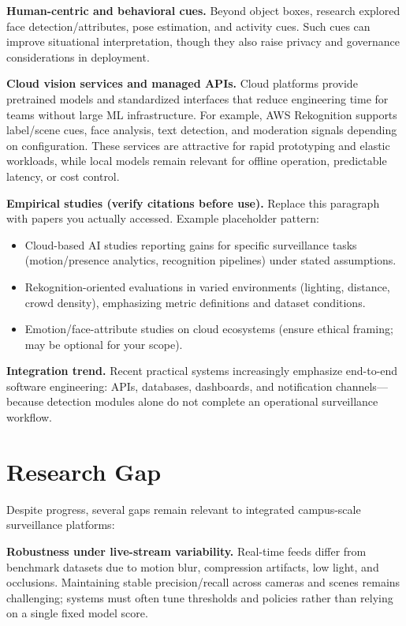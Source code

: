\documentclass[10pt,openany]{report}
\begin{document}
\begin{sloppypar}
{{{\begin{sloppypar}
\textbf{Human-centric and behavioral cues.} Beyond object boxes, research explored face detection/attributes, pose estimation, and activity cues. Such cues can improve situational interpretation, though they also raise privacy and governance considerations in deployment.

\textbf{Cloud vision services and managed APIs.} Cloud platforms provide pretrained models and standardized interfaces that reduce engineering time for teams without large ML infrastructure. For example, AWS Rekognition supports label/scene cues, face analysis, text detection, and moderation signals depending on configuration. These services are attractive for rapid prototyping and elastic workloads, while local models remain relevant for offline operation, predictable latency, or cost control.

\textbf{Empirical studies (verify citations before use).} Replace this paragraph with papers you actually accessed. Example placeholder pattern:
\begin{itemize}
  \item Cloud-based AI studies reporting gains for specific surveillance tasks (motion/presence analytics, recognition pipelines) under stated assumptions.
  \item Rekognition-oriented evaluations in varied environments (lighting, distance, crowd density), emphasizing metric definitions and dataset conditions.
  \item Emotion/face-attribute studies on cloud ecosystems (ensure ethical framing; may be optional for your scope).
\end{itemize}

\textbf{Integration trend.} Recent practical systems increasingly emphasize end-to-end software engineering: APIs, databases, dashboards, and notification channels---because detection modules alone do not complete an operational surveillance workflow.

\section{Research Gap}
Despite progress, several gaps remain relevant to integrated campus-scale surveillance platforms:

\textbf{Robustness under live-stream variability.} Real-time feeds differ from benchmark datasets due to motion blur, compression artifacts, low light, and occlusions. Maintaining stable precision/recall across cameras and scenes remains challenging; systems must often tune thresholds and policies rather than relying on a single fixed model score.


\end{sloppypar}}}}
\end{sloppypar}
\end{document}
